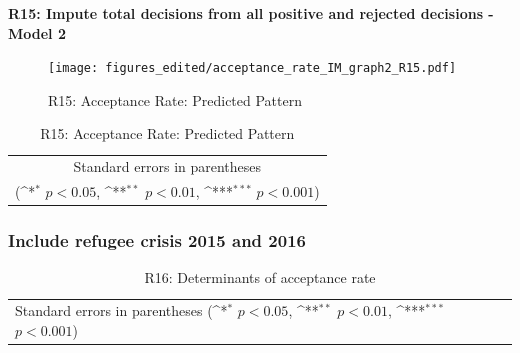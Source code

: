 \documentclass[10pt,a4paper]{scrartcl}
\begin{document}
\clearpage
\textbf{R15: Impute total decisions from all positive and rejected decisions - Model 2}
\begin{figure}[!ht]
	\centering
	\texttt{[image: figures\_edited/acceptance\_rate\_IM\_graph2\_R15.pdf]}
	\caption{R15: Acceptance Rate: Predicted Pattern}
\end{figure}

\begin{table}[!ht]\centering
	\footnotesize
	\renewcommand{\arraystretch}{1.2}
	\def\sym#1{\ifmmode^{#1}\else\(^{#1}\)\fi}
	\caption{R15: Acceptance Rate: Predicted Pattern}
	\begin{tabular}{l*{2}{c}}
		\hline\hline
		
		\hline\hline
		\multicolumn{3}{c}{\footnotesize Standard errors in parentheses} \\
		\multicolumn{3}{c}{\footnotesize (\sym{*} \(p<0.05\), \sym{**} \(p<0.01\), \sym{***} \(p<0.001\))} \\
	\end{tabular}
\end{table}






\clearpage
\FloatBarrier
\subsubsection{Include refugee crisis 2015 and 2016}
\begin{table}[!ht]\centering
	\renewcommand{\arraystretch}{1.25}
	\small
	\def\sym#1{\ifmmode^{#1}\else\(^{#1}\)\fi}
	\caption{R16: Determinants of acceptance rate}
	\begin{tabular}{l*{3}{c}}
		\hline\hline
		
		\hline\hline
		\multicolumn{4}{l}{\footnotesize Standard errors in parentheses (\sym{*} \(p<0.05\), \sym{**} \(p<0.01\), \sym{***} \(p<0.001\))}\\
	\end{tabular}
\end{table}
\end{document}
